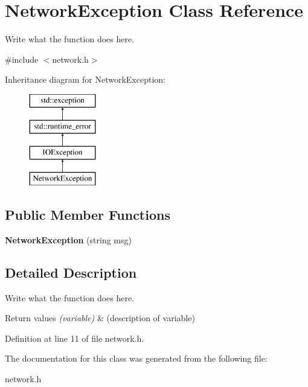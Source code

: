 \hypertarget{classNetworkException}{\section{Network\+Exception Class Reference}
\label{classNetworkException}
}


Write what the function does here.  




{\ttfamily \#include $<$network.\+h$>$}

Inheritance diagram for Network\+Exception\+:\begin{figure}[H]
\begin{center}
\leavevmode
\includegraphics[height=4.000000cm]{classNetworkException}
\end{center}
\end{figure}
\subsection*{Public Member Functions}
\begin{DoxyCompactItemize}
\item 
\hypertarget{classNetworkException_a7b2fde9c75da04d6a3d9e5bb332594ac}{{\bfseries Network\+Exception} (string msg)}\label{classNetworkException_a7b2fde9c75da04d6a3d9e5bb332594ac}

\end{DoxyCompactItemize}


\subsection{Detailed Description}
Write what the function does here. 


\begin{DoxyRetVals}{Return values}
{\em (variable)} & (description of variable) \\
\hline
\end{DoxyRetVals}


Definition at line 11 of file network.\+h.



The documentation for this class was generated from the following file\+:\begin{DoxyCompactItemize}
\item 
network.\+h\end{DoxyCompactItemize}
